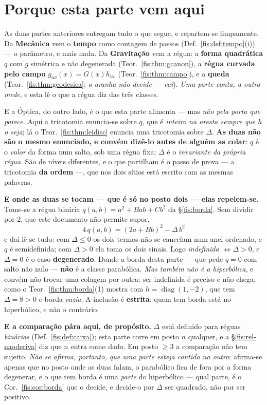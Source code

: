 \documentclass[livro.tex]{subfiles}
\begin{document}
\section{Porque esta parte vem aqui}\label{fis:rel-porque}

\noindent As duas partes anteriores entregam tudo o que segue, e repartem-se
limpamente. Da \textbf{Mecânica} vem o \textbf{tempo} como contagem de passos
(Def.~\ref{fis:def:tempo}(i)) --- o parâmetro, e mais nada. Da
\textbf{Gravitação} vem a régua: a \textbf{forma quadrática} $q$ com $g$
simétrica e não degenerada (Teor.~\ref{fis:thm:gcanon}), a \textbf{régua curvada
pelo campo} $g_{uv}(x)=G(x)h_{uv}$ (Teor.~\ref{fis:thm:campo}), e a
\textbf{queda} (Teor.~\ref{fis:thm:geodesica}: \emph{a aranha não decide ---
cai}). \emph{Uma parte conta, a outra mede}, e esta lê o que a régua diz das três
classes.

\medskip\noindent E a Óptica, do outro lado, é o que esta parte alimenta --- mas
\emph{não pela porta que parece}. Aqui a tricotomia enuncia-se sobre $q$, que é
\emph{inteiro na aresta sempre que $h$ o seja}; lá o
Teor.~\ref{fis:thm:leidisc} enuncia uma tricotomia
sobre $\Delta$. \textbf{As duas não são o mesmo enunciado, e convém dizê-lo antes
de alguém as colar}: $q$ é o \emph{valor} da forma num salto, sob uma régua fixa;
$\Delta$ é o \emph{invariante da própria régua}. São de níveis diferentes, e o
que partilham é o passo de prova --- a tricotomia \textbf{da ordem} ---, que nos
dois sítios está escrito com as mesmas palavras.

\medskip\noindent\textbf{E onde as duas se tocam --- que é só no posto dois ---
elas repelem-se.} Tome-se a régua binária $q(a,b)=a^{2}+Bab+Cb^{2}$ da
§\ref{fis:borda}. Sem dividir por $2$, que este documento não permite supor,
\[
\boxed{\;4\,q(a,b)=(2a+Bb)^{2}-\Delta\,b^{2}\;}
\]
e daí lê-se tudo: com $\Delta\le0$ os dois termos não se cancelam num anel
ordenado, e $q$ é semidefinida; com $\Delta>0$ ela toma os dois sinais. Logo
\emph{indefinida $\iff\Delta>0$}, e $\Delta=0$ é o caso \textbf{degenerado}.
Donde a borda desta parte --- que pede $q=0$ com salto não nulo --- \textbf{não}
é a classe parabólica. \emph{Mas também não é a hiperbólica}, e convém não trocar
uma colagem por outra: ser indefinida é preciso e não chega, como o
Teor.~\ref{fis:thm:borda}(1) mostra com $h=\operatorname{diag}(1,-2)$, que tem
$\Delta=8>0$ e borda \emph{vazia}. A inclusão é \textbf{estrita}: quem tem borda
está no hiperbólico, e não o contrário.

\medskip\noindent\textbf{E a comparação pára aqui, de propósito.} $\Delta$ está
definido para réguas \emph{binárias} (Def.~\ref{fis:def:caixa}); esta parte corre
em posto $n$ qualquer, e a §\ref{fis:rel-naoderiva} diz que $n$ entra como dado.
Em posto $\ge3$ a comparação não tem sujeito. \emph{Não se afirma, portanto, que
uma parte esteja contida na outra}: afirma-se apenas que no posto onde as duas
falam, o parabólico fica de fora por a forma degenerar, e o que tem borda é uma
\emph{parte} do hiperbólico --- qual parte, é o Cor.~\ref{fis:cor:borda} que o
decide, e decide-o por $\Delta$ ser quadrado, não por ser positivo.
\end{document}

